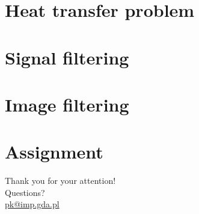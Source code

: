 \documentclass[10pt,aspectratio=169]{beamer} %
\begin{document}
\section{Heat transfer problem}
\section{Signal filtering}
\section{Image filtering}
\section{Assignment}
{
\begin{frame}[standout]
  Thank you for your attention!\\ \vspace{12pt}
  Questions?\\ \vspace{12pt}
  \url{pk@imp.gda.pl}
\end{frame}
}
\end{document}

